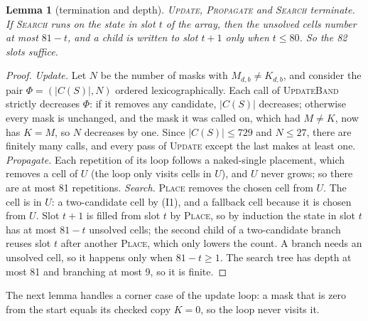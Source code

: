 \documentclass[11pt]{article}
\newtheorem{lemma}[theorem]{Lemma}
\theoremstyle{definition}
\theoremstyle{plain}
\let\origtextsc\textsc
\renewcommand{\textsc}[1]{\textup{\origtextsc{#1}}}
\begin{document}
\begin{lemma}[termination and depth]
\label{lem:termination}
\textsc{Update}, \textsc{Propagate} and \textsc{Search} terminate. If \textsc{Search} runs on the state in slot $t$ of
the array, then the unsolved cells number at most $81-t$, and a child is written to slot $t+1$ only when $t\le 80$. So
the 82 slots suffice.
\end{lemma}
\begin{proof}
\emph{Update.} Let $N$ be the number of masks with $M_{d,b}\neq K_{d,b}$, and consider the pair
$\Phi=(|C(S)|, N)$ ordered lexicographically. Each call of \textsc{UpdateBand} strictly decreases $\Phi$: if it
removes any candidate, $|C(S)|$ decreases; otherwise every mask is unchanged, and the mask it was called on, which had
$M\neq K$, now has $K=M$, so $N$ decreases by one. Since $|C(S)|\le 729$ and $N\le 27$, there are finitely many calls,
and every pass of \textsc{Update} except the last makes at least one.
\emph{Propagate.} Each repetition of its loop follows a naked-single placement, which removes a cell of $U$ (the loop
only visits cells in $U$), and $U$ never grows; so there are at most 81 repetitions.
\emph{Search.} \textsc{Place} removes the chosen cell from $U$. The cell is in $U$: a two-candidate cell by (I1), and a
fallback cell because it is chosen from $U$. Slot $t+1$ is filled from slot $t$ by \textsc{Place}, so by induction the
state in slot $t$ has at most $81-t$ unsolved cells; the second child of a two-candidate branch reuses slot $t$ after
another \textsc{Place}, which only lowers the count. A branch needs an unsolved cell, so it happens only when
$81-t\ge 1$. The search tree has depth at most 81 and branching at most 9, so it is finite.
\end{proof}

The next lemma handles a corner case of the update loop: a mask that is zero from the start equals its checked copy
$K=0$, so the loop never visits it.
\end{document}
